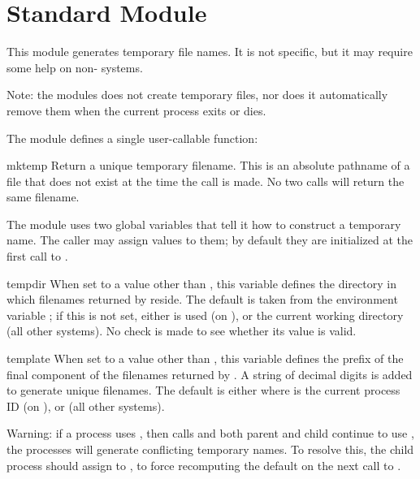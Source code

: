 \section{Standard Module }
\label{module-tempfile}

\renewcommand{\indexsubitem}{(in module tempfile)}

This module generates temporary file names.  It is not \UNIX{} specific,
but it may require some help on non-\UNIX{} systems.

Note: the modules does not create temporary files, nor does it
automatically remove them when the current process exits or dies.

The module defines a single user-callable function:

\begin{funcdesc}{mktemp}{}
Return a unique temporary filename.  This is an absolute pathname of a
file that does not exist at the time the call is made.  No two calls
will return the same filename.
\end{funcdesc}

The module uses two global variables that tell it how to construct a
temporary name.  The caller may assign values to them; by default they
are initialized at the first call to .

\begin{datadesc}{tempdir}
When set to a value other than , this variable defines the
directory in which filenames returned by  reside.  The
default is taken from the environment variable ; if this
is not set, either  is used (on \UNIX{}), or the current
working directory (all other systems).  No check is made to see
whether its value is valid.
\end{datadesc}

\begin{datadesc}{template}
When set to a value other than , this variable defines the
prefix of the final component of the filenames returned by
.  A string of decimal digits is added to generate
unique filenames.  The default is either  where
 is the current process ID (on \UNIX{}), or  (all
other systems).
\end{datadesc}

Warning: if a \UNIX{} process uses , then calls
 and both parent and child continue to use
, the processes will generate conflicting temporary
names.  To resolve this, the child process should assign 
to , to force recomputing the default on the next call
to .
